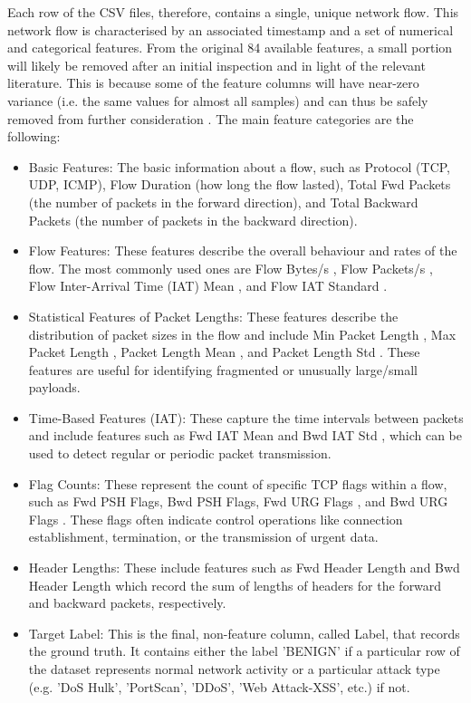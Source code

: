 Each row of the CSV files, therefore, contains a single, unique network flow. This network flow is characterised by an associated timestamp and a set of numerical and categorical features. From the original 84 available features, a small portion will likely be removed after an initial inspection and in light of the relevant literature. This is because some of the feature columns will have near-zero variance (i.e. the same values for almost all samples) and can thus be safely removed from further consideration \parencite {kumar2021cicids}. The main feature categories are the following: 
\begin{itemize}[noitemsep] 
\item Basic Features: The basic information about a flow, such as Protocol (TCP, UDP, ICMP), Flow Duration (how long the flow lasted), Total Fwd Packets (the number of packets in the forward direction), and Total Backward Packets (the number of packets in the backward direction).
\item Flow Features: These features describe the overall behaviour and rates of the flow. The most commonly used ones are Flow Bytes/s , Flow Packets/s , Flow Inter-Arrival Time (IAT) Mean , and Flow IAT Standard .
\item Statistical Features of Packet Lengths: These features describe the distribution of packet sizes in the flow and include Min Packet Length , Max Packet Length , Packet Length Mean , and Packet Length Std . These features are useful for identifying fragmented or unusually large/small payloads.
\item Time-Based Features (IAT): These capture the time intervals between packets and include features such as Fwd IAT Mean and Bwd IAT Std , which can be used to detect regular or periodic packet transmission.
\item Flag Counts: These represent the count of specific TCP flags within a flow, such as Fwd PSH Flags, Bwd PSH Flags, Fwd URG Flags , and Bwd URG Flags . These flags often indicate control operations like connection establishment, termination, or the transmission of urgent data.
\item Header Lengths: These include features such as Fwd Header Length and Bwd Header Length which record the sum of lengths of headers for the forward and backward packets, respectively.
\item Target Label: This is the final, non-feature column, called Label, that records the ground truth. It contains either the label 'BENIGN' if a particular row of the dataset represents normal network activity or a particular attack type (e.g. 'DoS Hulk', 'PortScan', 'DDoS', 'Web Attack-XSS', etc.) if not. 
\end{itemize} 
